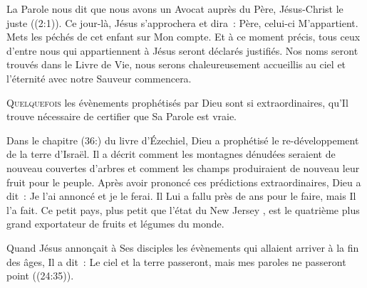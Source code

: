 
La Parole nous dit que \og nous
 avons un Avocat auprès du Père, Jésus-Christ le juste \fg{}
 ((2:1)).
 Ce jour-là, Jésus s'approchera et dira~: 
 \og Père, celui-ci M'appartient. Mets les péchés de cet enfant
 sur Mon compte. \fg{}
 Et à ce moment précis, tous ceux d'entre nous qui appartiennent à Jésus
 seront déclarés justifiés. Nos noms seront trouvés dans le Livre de Vie,
 nous serons chaleureusement accueillis au ciel et l'éternité
 avec notre Sauveur commencera. 

\dvrule







\lettrine{Q}{uelquefois} les évènements prophétisés par Dieu
 sont si extraordinaires, qu'Il trouve nécessaire de certifier
 que Sa Parole est vraie. 

Dans le chapitre (36:) du livre d'Ézechiel, Dieu a prophétisé
 le re-développement de la terre d'Israël.
 Il a décrit comment les montagnes dénudées seraient de nouveau couvertes
 d'arbres et comment les 
 champs produiraient de nouveau leur fruit pour le peuple.
 Après avoir prononcé ces prédictions extraordinaires,
 Dieu a dit~: 
 \og Je l'ai annoncé et je le ferai. \fg{}
 Il Lui a fallu près de  ans pour le faire, mais Il l'a fait.
 Ce petit pays, plus petit que l'état du New Jersey ,
 est le quatrième plus grand exportateur de fruits et légumes du monde. 


Quand Jésus annonçait à Ses disciples les évènements
 qui allaient arriver à la fin des âges, Il a dit~: 
 \og Le ciel et la terre passeront, mais mes paroles ne passeront point \fg{}
 ((24:35)). 

